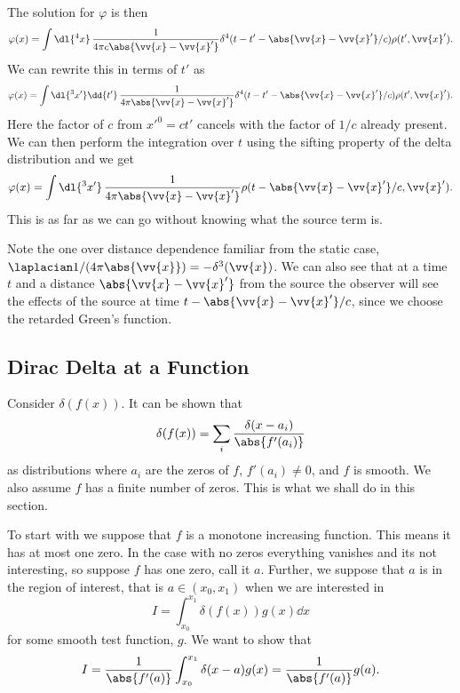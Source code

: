 The solution for \(\varphi\) is then
\begin{equation}
    \varphi(x) = \int \dl{^4x} \, \frac{1}{4\pi c\abs{\vv{x} - \vv{x}'}} \delta^4(t - t' - \abs{\vv{x} - \vv{x}'}/c) \rho(t', \vv{x}').
\end{equation}
We can rewrite this in terms of \(t'\) as
\begin{equation}
    \varphi(x) = \int \dl{^3x'} \dd{t'} \, \frac{1}{4\pi \abs{\vv{x} - \vv{x}'}} \delta^4(t - t' - \abs{\vv{x} - \vv{x}'}/c) \rho(t', \vv{x}').
\end{equation}
Here the factor of \(c\) from \({x'}^0 = ct'\) cancels with the factor of \(1/c\) already present.
We can then perform the integration over \(t\) using the sifting property of the delta distribution and we get
\begin{equation}
    \varphi(x) = \int \dl{^3x'} \, \frac{1}{4\pi \abs{\vv{x} - \vv{x}'}} \rho(t  - \abs{\vv{x} - \vv{x}'}/c, \vv{x}').
\end{equation}
This is as far as we can go without knowing what the source term is.

Note the one over distance dependence familiar from the static case, \(\laplacian 1/(4\pi\abs{\vv{x}}) = -\delta^3(\vv{x})\).
We can also see that at a time \(t\) and a distance \(\abs{\vv{x} - \vv{x}'}\) from the source the observer will see the effects of the source at time \(t - \abs{\vv{x} - \vv{x}'}/c\), since we choose the retarded Green's function.

\subsection{Dirac Delta at a Function}
Consider \(\delta(f(x))\).
It can be shown that
\begin{equation}\label{eqn:delta(f(x))}
    \delta(f(x)) = \sum_{i} \frac{\delta(x - a_i)}{\abs{f'(a_i)}}
\end{equation}
as distributions where \(a_i\) are the zeros of \(f\), \(f'(a_i) \ne 0\), and \(f\) is smooth.
We also assume \(f\) has a finite number of zeros.
This is what we shall do in this section.

To start with we suppose that \(f\) is a monotone increasing function.
This means it has at most one zero.
In the case with no zeros everything vanishes and its not interesting, so suppose \(f\) has one zero, call it \(a\).
Further, we suppose that \(a\) is in the region of interest, that is \(a \in (x_0, x_1)\) when we are interested in
\begin{equation}
    I = \int_{x_0}^{x_1} \delta(f(x)) g(x) \dd{x}
\end{equation}
for some smooth test function, \(g\).
We want to show that
\begin{equation}
    I = \frac{1}{\abs{f'(a)}} \int_{x_0}^{x_1} \delta(x - a) g(x) = \frac{1}{\abs{f'(a)}} g(a).
\end{equation}

